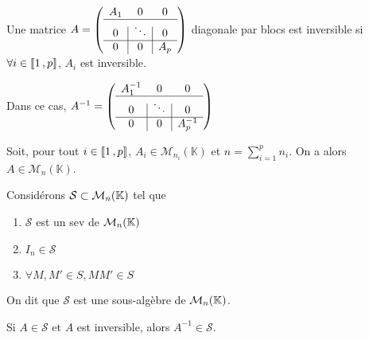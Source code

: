     \begin{coro}{}{}
        Une matrice $A = \left( \begin{array}{c | c | c}
            A_1 & 0 & 0 \\
            \hline 
            0 & \ddots & 0 \\
            \hline 
            0 & 0 & A_p 
        \end{array} \right)$ diagonale par blocs est inversible si $\forall i \in \left\llbracket 1 \, , p \right\rrbracket$, $A_i$ est inversible.

        Dans ce cas, $A^{-1} = \left( \begin{array}{c | c | c}
            A_1^{-1} & 0 & 0 \\
            \hline 
            0 & \ddots & 0 \\
            \hline 
            0 & 0 & A_p^{-1} 
        \end{array} \right)$
    \end{coro}

    \begin{lem}{}{}
        Soit, pour tout $i \in \left\llbracket 1 \, , p \right\rrbracket$, $A_i \in \mathcal{M}_{n_i}(\mathbb{K})$ et $n = \sum_{i=1}^p n_i$. On a alors $A \in \mathcal{M}_n(\mathbb{K})$. 
        
        Considérons $\mathcal{S} \subset \mathcal{M}_{n}(\mathbb{K})$ tel que 
        \begin{enumerate}[label=\textcolor{mybrown}{($h_{\alph*}$)}]
            \item $\mathcal{S}$ est un sev de $\mathcal{M}_{n}(\mathbb{K})$
            \item $I_n \in \mathcal{S}$
            \item $\forall M, M' \in S, MM' \in S$
        \end{enumerate}
        On dit que $\mathcal{S}$ est une sous-algèbre de $\mathcal{M}_{n}(\mathbb{K})$.

        Si $A \in \mathcal{S}$ et $A$ est inversible, alors $A^{-1} \in \mathcal{S}$.
    \end{lem}

